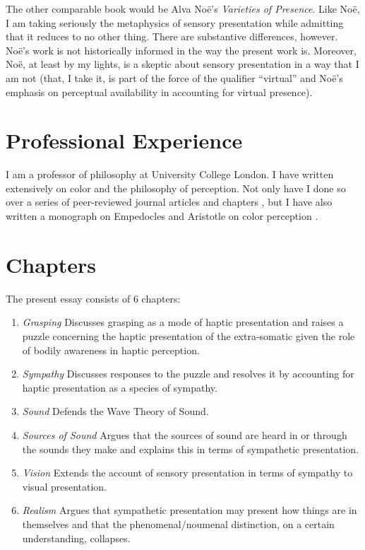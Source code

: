 \documentclass[12pt]{article}
\begin{document}
The other comparable book would be Alva No\"{e}'s \emph{Varieties of Presence}. Like No\"{e}, I am taking seriously the metaphysics of sensory presentation while admitting that it reduces to no other thing. There are substantive differences, however. No\"{e}'s work is not historically informed in the way the present work is. Moreover, No\"{e}, at least by my lights, is a skeptic about sensory presentation in a way that I am not (that, I take it, is part of the force of the qualifier ``virtual'' and No\"{e}'s emphasis on perceptual availability in accounting for virtual presence).


\section{Professional Experience} %
\label{sec:professional_experience}

I am a professor of philosophy at University College London. I have written extensively on color and the philosophy of perception. Not only have I done so over a series of peer-reviewed journal articles and chapters \citep{Hilbert:2000on,Kalderon:2006tg,Kalderon:2008fk,Kalderon:2007mr,Kalderon:2010fj,Kalderon:2010fk,Kalderon:2011fk,Kalderon:2012fk}, but I have also written a monograph on Empedocles and Aristotle on color perception \citep{Kalderon:2015fr}.


\section{Chapters} %
\label{sec:chapters}

The present essay consists of 6 chapters:

\begin{enumerate}
	\item \emph{Grasping} Discusses grasping as a mode of haptic presentation and raises a puzzle concerning the haptic presentation of the extra-somatic given the role of bodily awareness in haptic perception.
	\item \emph{Sympathy} Discusses responses to the puzzle and resolves it by accounting for haptic presentation as a species of sympathy.
	\item \emph{Sound} Defends the Wave Theory of Sound.
	\item \emph{Sources of Sound} Argues that the sources of sound are heard in or through the sounds they make and explains this in terms of sympathetic presentation.
	\item \emph{Vision} Extends the account of sensory presentation in terms of sympathy to visual presentation.
	\item \emph{Realism} Argues that sympathetic presentation may present how things are in themselves and that the phenomenal/noumenal distinction, on a certain understanding, collapses.
\end{enumerate}
\end{document}
